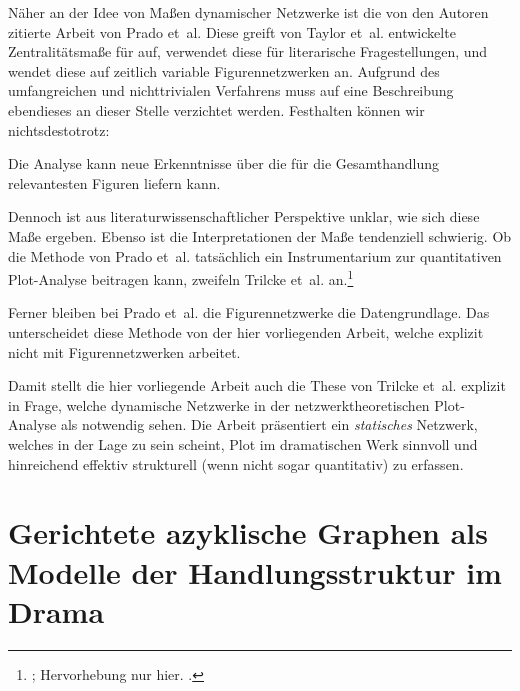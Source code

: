 \documentclass[a4paper,10pt,abstract=true,headings=small]{scrartcl}
\newcommand{\eng}[1]{\textenglish{\emph{#1}}}
\begin{document}
Näher an der Idee von Maßen dynamischer Netzwerke ist die von den Autoren zitierte Arbeit von Prado et~al. 
Diese greift von Taylor et~al. entwickelte Zentralitätsmaße für \textquote{\eng{temporal networks}} auf, verwendet diese für literarische Fragestellungen, und wendet diese auf zeitlich variable Figurennetzwerken an.\autocites{prado_temporal_2016}{taylor_eigenvector-based_2015}
Aufgrund des umfangreichen und nichttrivialen Verfahrens muss auf eine Beschreibung ebendieses an dieser Stelle verzichtet werden.
Festhalten können wir nichtsdestotrotz:
\begin{enumerate*}
    \item Die Analyse kann neue Erkenntnisse über die für die Gesamthandlung relevantesten Figuren liefern kann.
    \item Dennoch ist aus literaturwissenschaftlicher Perspektive unklar, wie sich diese Maße ergeben.
        Ebenso ist die Interpretationen der Maße tendenziell schwierig.\autocite[Vgl.][14--15]{prado_temporal_2016}
        Ob die Methode von Prado et~al. tatsächlich ein Instrumentarium zur quantitativen Plot-Analyse beitragen kann, zweifeln Trilcke et~al. an.\footnote{; Hervorhebung nur hier. \cite[176]{trilcke_netzwerkdynamik_2017}.}
    \item Ferner bleiben bei Prado et~al. die Figurennetzwerke die Datengrundlage.
       Das unterscheidet diese Methode von der hier vorliegenden Arbeit, welche explizit nicht mit Figurennetzwerken arbeitet.
\end{enumerate*}

Damit stellt die hier vorliegende Arbeit auch die These von Trilcke et~al. explizit in Frage, welche dynamische Netzwerke in der netzwerktheoretischen Plot-Analyse als notwendig sehen.
Die Arbeit präsentiert ein \emph{statisches} Netzwerk, welches in der Lage zu sein scheint, Plot im dramatischen Werk sinnvoll und hinreichend effektiv strukturell (wenn nicht sogar quantitativ) zu erfassen.


\section{Gerichtete azyklische Graphen als Modelle der Handlungsstruktur im Drama}\label{sec:situationsgraph}
\end{document}
